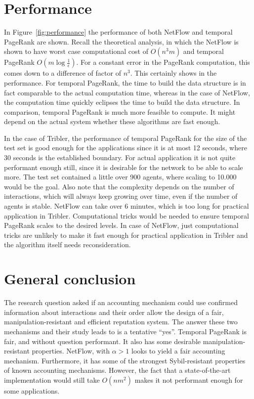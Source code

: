 \documentclass[a4paper,11pt]{book}
\newcommand{\eps}{\epsilon}
\theoremstyle{definition}
\begin{document}
\section{Performance}

In Figure~\ref{fig:performance} the performance of both NetFlow and temporal PageRank are
shown. Recall the theoretical analysis, in which the NetFlow is shown to have
worst case computational cost of $O(n^3m)$ and temporal PageRank $O(m\log\frac1\eps)$. For
a constant error in the PageRank computation, this comes down to a difference of factor of $n^3$.
This certainly shows in the performance. For temporal PageRank, the time to build the data structure
is in fact comparable to the actual computation time, whereas in the case of NetFlow, the computation
time quickly eclipses the time to build the data structure. In comparison, temporal PageRank is much 
more feasible to compute. It might depend on the actual system whether these algorithms are fast enough.

In the case of Tribler, the performance of temporal PageRank for the size of the test set is good enough
for the applications since it is at most 12 seconds, where 30 seconds is the established boundary. 
For actual application it is not quite performant enough still, 
since it is desirable for the network to be able to scale more. The test set contained
a little over 900 agents, where scaling to 10.000 would be the goal. Also note that the
complexity depends on the number of interactions, which will always keep growing over
time, even if the number of agents is stable.
NetFlow can take over 6 minutes, which is too long for practical application in Tribler.
Computational tricks would be needed to ensure temporal PageRank scales to the desired
levels. In case of NetFlow, just computational tricks are unlikely to make it fast enough
for practical application in Tribler and the algorithm itself needs reconsideration.

\section{General conclusion}

The research question asked if an accounting mechanism could use confirmed information about
interactions and their order allow the design of a fair, manipulation-resistant and efficient
reputation system. The answer these two mechanisms and their study leads to is a tentative
``yes''. Temporal PageRank is fair, and without question performant. It also
has some desirable manipulation-resistant properties. NetFlow, with $\alpha>1$ looks to
yield a fair accounting mechanism. Furthermore, it has some of the strongest Sybil-resistant
properties of known accounting mechanisms. However, the fact that a state-of-the-art implementation
would still take $O(nm^2)$ makes it not performant enough for some applications.
\end{document}
